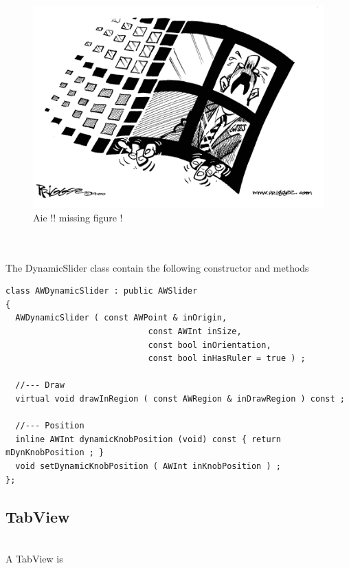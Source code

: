 \documentclass[a4paper,11pt]{extarticle}
\begin{document}
\begin{figure}[htbp]
   \centering
   \includegraphics[scale=0.55]{AWFig.png} 
   \caption{Aie !! missing figure !}
   \label{fig:13}
\end{figure}

~\\

~\\ The DynamicSlider class contain the following constructor and methods

\begin{lstlisting}[language=Arduinonl]
class AWDynamicSlider : public AWSlider
{
  AWDynamicSlider ( const AWPoint & inOrigin,
                             const AWInt inSize,
                             const bool inOrientation,
                             const bool inHasRuler = true ) ;
  
  //--- Draw
  virtual void drawInRegion ( const AWRegion & inDrawRegion ) const ;
  
  //--- Position
  inline AWInt dynamicKnobPosition (void) const { return mDynKnobPosition ; }
  void setDynamicKnobPosition ( AWInt inKnobPosition ) ;
};
\end{lstlisting}


\newpage
\subsection{TabView}

~\\ A TabView is 
~\\
~\\
\end{document}
